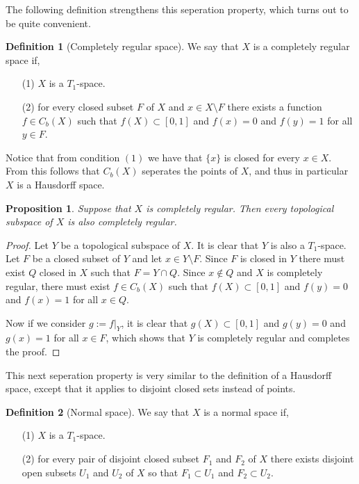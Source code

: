 \documentclass[11pt,a4paper]{article}
\theoremstyle{definition}
\newtheorem{definition}{Definition}[section]
\theoremstyle{plain}
\newtheorem{proposition}[theorem]{Proposition}
\begin{document}
  The following definition strengthens this seperation property, which
  turns out to be quite convenient.

  \begin{definition}[Completely regular space]
      We say that $X$ is a completely regular space if,
      \begin{itemize}
        \item[(1)] $X$ is a $T_1$-space.
        \item[(2)] for every closed subset $F$ of $X$ and $x \in X \setminus F$
          there exists a function $f \in C_b(X)$ such that $f(X) \subset [0,1]$ 
          and $f(x) = 0$ and $f(y) = 1$ for all $y \in F$.
      \end{itemize}
  \end{definition}

  Notice that from condition $(1)$ we have that $\{x\}$ is closed for every
  $x \in X$. From this follows that $C_b(X)$ seperates the points of $X$,
  and thus in particular $X$ is a Hausdorff space.

  \begin{proposition}
    Suppose that $X$ is completely regular. Then every topological subspace
    of $X$ is also completely regular.
  \end{proposition}
  \begin{proof}
    Let $Y$ be a topological subspace of $X$. It is clear that $Y$ is also
    a $T_1$-space. Let $F$ be a closed subset of $Y$ and let 
    $x \in Y \setminus F$. Since $F$ is closed in $Y$ there must exist
    $Q$ closed in $X$ such that $F = Y \cap Q$. Since $x \notin Q$ and
    $X$ is completely regular, there must exist $f \in C_b(X)$ such that
    $f(X) \subset [0,1]$ and $f(y) = 0$ and $f(x) = 1$ for all $x \in Q$.
    
    Now if we consider $g := f\vert_Y$, it is clear that
    $g(X) \subset [0,1]$ and $g(y) = 0$ and $g(x) = 1$ for all $x \in F$,
    which shows that $Y$ is completely regular and completes the proof.
  \end{proof}

  This next seperation property is very similar to the definition of a
  Hausdorff space, except that it applies to disjoint closed sets instead
  of points.

  \begin{definition}[Normal space]
    We say that $X$ is a normal space if,
    \begin{itemize}
        \item[(1)] $X$ is a $T_1$-space.
        \item[(2)] for every pair of disjoint closed subset $F_1$ and $F_2$ 
          of $X$ there exists disjoint open subsets $U_1$ and $U_2$ of $X$
          so that $F_1 \subset U_1$ and $F_2 \subset U_2$.
      \end{itemize}
  \end{definition}
\end{document}
